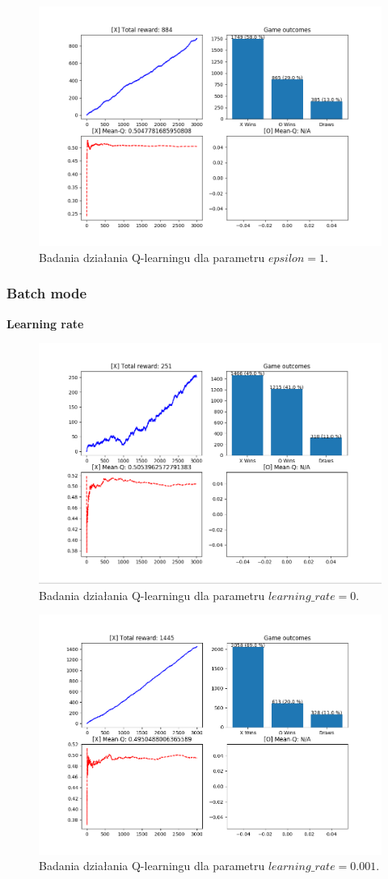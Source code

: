 \begin{figure}[H]
	\centering
	\includegraphics[width=0.7\linewidth]{imgs/q_learning/analysis/no_batch/eps/eps_1}
	\caption{Badania działania Q-learningu dla parametru $epsilon = 1$.}
\end{figure}

\pagebreak

\subsubsection{Batch mode}

\textbf{Learning rate}
\begin{figure}[H]
	\centering
	\includegraphics[width=0.7\linewidth]{imgs/q_learning/analysis/batch/lr/lr_0.png}
	\caption{Badania działania Q-learningu dla parametru $learning\_rate = 0$.}
\end{figure}

\begin{figure}[H]
	\centering
	\includegraphics[width=0.7\linewidth]{imgs/q_learning/analysis/batch/lr/lr_0001}
	\caption{Badania działania Q-learningu dla parametru $learning\_rate = 0.001$.}
\end{figure}

